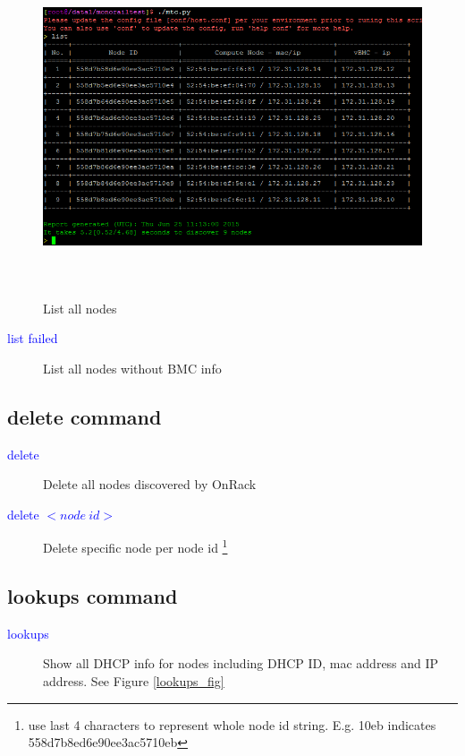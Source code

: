 \documentclass [12pt, a4paper, titlepage]{article}
\begin{document}
         \begin{figure}[H]
         \begin{center}
         \includegraphics[width=15cm,height=10cm]{png/list.png}
         \end{center}
         \caption{List all nodes}
         \label{list}
         \end{figure}

        \begin{description}
            \item[\textcolor{blue}{list failed}] List all nodes without BMC info
        \end{description}

\subsection{delete command}
        \begin{description}
            \item[\textcolor{blue}{delete}] Delete all nodes discovered by OnRack
        \end{description}

        \begin{description}
        \item[\textcolor{blue}{delete $<node\ id>$}] Delete specific node per node id \footnote{use last 4 characters to represent whole node id string. E.g. 10eb indicates 558d7b8ed6e90ee3ac5710eb}
        \end{description}

\subsection{lookups command}
        \begin{description}
            \item[\textcolor{blue}{lookups}] Show all DHCP info for nodes including DHCP ID, mac address and IP address. See Figure \ref{lookups_fig}
        \end{description}
\end{document}
